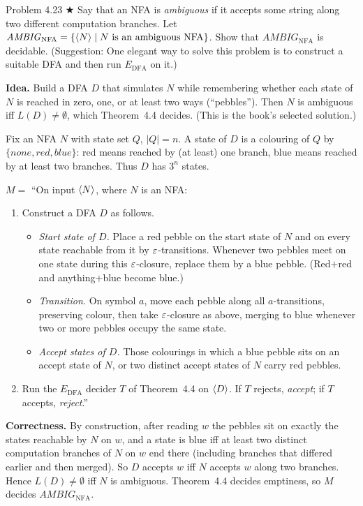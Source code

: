 \begin{question}{Problem 4.23 $\bigstar$}
Say that an NFA is \emph{ambiguous} if it accepts some string along two different computation branches. Let $\mathit{AMBIG}_{\mathrm{NFA}}=\{\langle N\rangle\mid N\text{ is an ambiguous NFA}\}$. Show that $\mathit{AMBIG}_{\mathrm{NFA}}$ is decidable. (Suggestion: One elegant way to solve this problem is to construct a suitable DFA and then run $E_{\mathrm{DFA}}$ on it.)
\end{question}
\begin{soln}
\textbf{Idea.} Build a DFA $D$ that simulates $N$ while remembering whether each state of $N$ is reached in zero, one, or at least two ways (``pebbles''). Then $N$ is ambiguous iff $L(D)\neq\emptyset$, which Theorem~4.4 decides. (This is the book's selected solution.)

Fix an NFA $N$ with state set $Q$, $|Q|=n$. A state of $D$ is a colouring of $Q$ by $\{\mathit{none},\mathit{red},\mathit{blue}\}$: red means reached by (at least) one branch, blue means reached by at least two branches. Thus $D$ has $3^n$ states.

$M=$ ``On input $\langle N\rangle$, where $N$ is an NFA:
\begin{enumerate}
\item Construct a DFA $D$ as follows.
\begin{itemize}
\item \emph{Start state of $D$.} Place a red pebble on the start state of $N$ and on every state reachable from it by $\varepsilon$-transitions. Whenever two pebbles meet on one state during this $\varepsilon$-closure, replace them by a blue pebble. (Red$+$red and anything$+$blue become blue.)
\item \emph{Transition.} On symbol $a$, move each pebble along all $a$-transitions, preserving colour, then take $\varepsilon$-closure as above, merging to blue whenever two or more pebbles occupy the same state.
\item \emph{Accept states of $D$.} Those colourings in which a blue pebble sits on an accept state of $N$, or two distinct accept states of $N$ carry red pebbles.
\end{itemize}
\item Run the $E_{\mathrm{DFA}}$ decider $T$ of Theorem~4.4 on $\langle D\rangle$. If $T$ rejects, \emph{accept}; if $T$ accepts, \emph{reject}.''
\end{enumerate}

\textbf{Correctness.} By construction, after reading $w$ the pebbles sit on exactly the states reachable by $N$ on $w$, and a state is blue iff at least two distinct computation branches of $N$ on $w$ end there (including branches that differed earlier and then merged). So $D$ accepts $w$ iff $N$ accepts $w$ along two branches. Hence $L(D)\neq\emptyset$ iff $N$ is ambiguous. Theorem~4.4 decides emptiness, so $M$ decides $\mathit{AMBIG}_{\mathrm{NFA}}$.
\end{soln}

